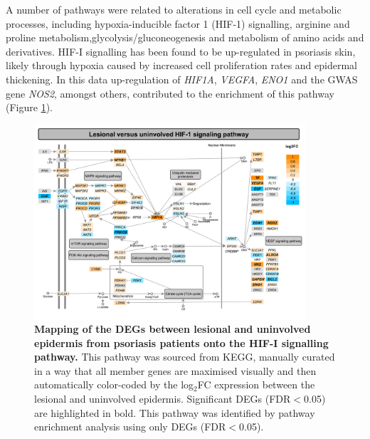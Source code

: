 A number of pathways were related to alterations in cell cycle and metabolic processes, including hypoxia-inducible factor 1 (HIF-1) signalling, arginine and proline metabolism,glycolysis/gluconeogenesis and metabolism of amino acids and derivatives. %
HIF-I signalling has been found to be up-regulated in psoriasis skin, likely through hypoxia caused by increased cell proliferation rates and epidermal thickening. In this data up-regulation of \textit{HIF1A}, \textit{VEGFA}, \textit{ENO1} and the GWAS gene \textit{NOS2}, amongst others, contributed to the enrichment of this pathway (Figure \ref{figure:PS_lesional_vs_uninvolved_HIF_pathway}). 

\begin{figure}[htbp]
\centering
\includegraphics[width=0.9\textwidth]{./Results2/pdfs/PS_lesional_uninvolved_all_HIF_1_pathway}
\caption[Mapping of the DEGs between lesional and uninvolved epidermis from psoriasis patients onto the HIF-I signalling pathway.]{\textbf{Mapping of the DEGs between lesional and uninvolved epidermis from psoriasis patients onto the HIF-I signalling pathway.} This pathway was sourced from KEGG, manually curated in a way that all member genes are maximised visually and then automatically color-coded by the log$_2$FC expression between the lesional and uninvolved epidermis. Significant DEGs (FDR$<$0.05) are highlighted in bold. This pathway was identified by pathway enrichment analysis using only DEGs (FDR$<$0.05).}
\label{figure:PS_lesional_vs_uninvolved_HIF_pathway}
\end{figure}

